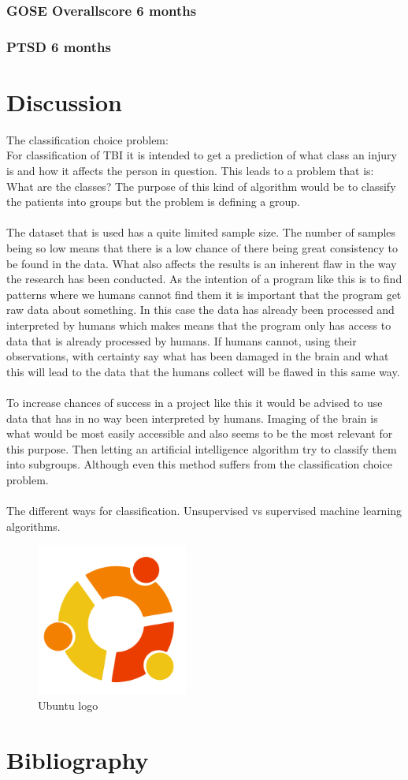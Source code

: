 \documentclass[11pt]{article}
\begin{document}
\subsubsection{GOSE Overallscore 6 months}
\subsubsection{PTSD 6 months}

\section{Discussion}
The classification choice problem:\\
For classification of TBI it is intended to get a prediction of what class an injury is and how it affects the person in question. This leads to a problem that is: What are the classes? The purpose of this kind of algorithm would be to classify the patients into groups but the problem is defining a group.\\
\\
The dataset that is used has a quite limited sample size. The number of samples being so low means that there is a low chance of there being great consistency to be found in the data. What also affects the results is an inherent flaw in the way the research has been conducted. As the intention of a program like this is to find patterns where we humans cannot find them it is important that the program get raw data about something. In this case the data has already been processed and interpreted by humans which makes means that the program only has access to data that is already processed by humans. If humans cannot, using their observations, with certainty say what has been damaged in the brain and what this will lead to the data that the humans collect will be flawed in this same way.\\
\\
To increase chances of success in a project like this it would be advised to use data that has in no way been interpreted by humans. Imaging of the brain is what would be most easily accessible and also seems to be the most relevant for this purpose. Then letting an artificial intelligence algorithm try to classify them into subgroups. Although even this method suffers from the classification choice problem.\\
\\
The different ways for classification. Unsupervised vs supervised machine learning algorithms.

\begin{figure}[ht]
  \centering
  \includegraphics[width=5cm]{graphics/ubuntu.png}
  \caption{Ubuntu logo}
\end{figure}

\section{Bibliography}

\printbibliography
\end{document}

